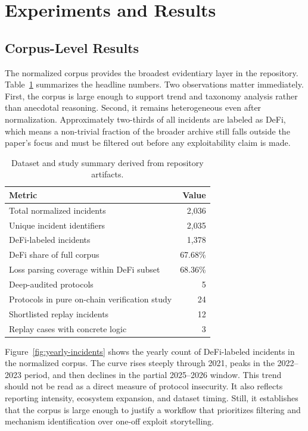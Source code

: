 \section{Experiments and Results}
\label{sec:experiments}

\subsection{Corpus-Level Results}

The normalized corpus provides the broadest evidentiary layer in the repository. Table~\ref{tab:dataset-summary} summarizes the headline numbers. Two observations matter immediately. First, the corpus is large enough to support trend and taxonomy analysis rather than anecdotal reasoning. Second, it remains heterogeneous even after normalization. Approximately two-thirds of all incidents are labeled as DeFi, which means a non-trivial fraction of the broader archive still falls outside the paper's focus and must be filtered out before any exploitability claim is made.

\begin{table}[t]
\centering
\caption{Dataset and study summary derived from repository artifacts.}
\label{tab:dataset-summary}
\begin{tabular}{lr}
\toprule
\textbf{Metric} & \textbf{Value} \\
\midrule
Total normalized incidents & 2{,}036 \\
Unique incident identifiers & 2{,}035 \\
DeFi-labeled incidents & 1{,}378 \\
DeFi share of full corpus & 67.68\% \\
Loss parsing coverage within DeFi subset & 68.36\% \\
Deep-audited protocols & 5 \\
Protocols in pure on-chain verification study & 24 \\
Shortlisted replay incidents & 12 \\
Replay cases with concrete logic & 3 \\
\bottomrule
\end{tabular}
\end{table}

Figure~\ref{fig:yearly-incidents} shows the yearly count of DeFi-labeled incidents in the normalized corpus. The curve rises steeply through 2021, peaks in the 2022--2023 period, and then declines in the partial 2025--2026 window. This trend should not be read as a direct measure of protocol insecurity. It also reflects reporting intensity, ecosystem expansion, and dataset timing. Still, it establishes that the corpus is large enough to justify a workflow that prioritizes filtering and mechanism identification over one-off exploit storytelling.

